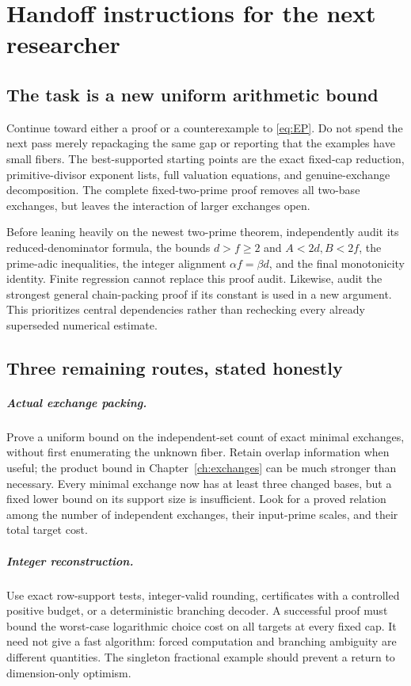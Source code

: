\chapter{Handoff instructions for the next researcher}\label{ch:next}
\section{The task is a new uniform arithmetic bound}
Continue toward either a proof or a counterexample to \eqref{eq:EP}. Do not
spend the next pass merely repackaging the same gap or reporting that the
examples have small fibers. The best-supported starting points are the exact
fixed-cap reduction, primitive-divisor exponent lists, full valuation equations,
and genuine-exchange decomposition. The complete fixed-two-prime proof removes
all two-base exchanges, but leaves the interaction of larger exchanges open.

Before leaning heavily on the newest two-prime theorem, independently audit its
reduced-denominator formula, the bounds $d>f\ge2$ and $A<2d,B<2f$, the
prime-adic inequalities, the integer alignment $\alpha f=\beta d$, and the final
monotonicity identity. Finite regression cannot replace this proof audit.
Likewise, audit the strongest general chain-packing proof if its constant is
used in a new argument. This prioritizes central dependencies rather than
rechecking every already superseded numerical estimate.

\section{Three remaining routes, stated honestly}
\paragraph{Actual exchange packing.}
Prove a uniform bound on the independent-set count of exact minimal exchanges,
without first enumerating the unknown fiber. Retain overlap information when
useful; the product bound in Chapter~\ref{ch:exchanges} can be much stronger
than necessary. Every minimal exchange now has at least three changed bases,
but a fixed lower bound on its support size is insufficient. Look for a proved
relation among the number of independent exchanges, their input-prime scales,
and their total target cost.

\paragraph{Integer reconstruction.}
Use exact row-support tests, integer-valid rounding, certificates with a
controlled positive budget, or a deterministic branching decoder. A successful
proof must bound the worst-case logarithmic choice cost on all targets at every
fixed cap. It need not give a fast algorithm: forced computation and branching
ambiguity are different quantities. The singleton fractional example should
prevent a return to dimension-only optimism.

